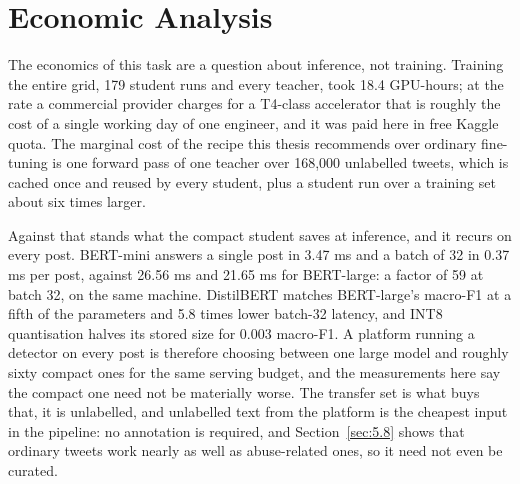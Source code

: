 \section{Economic Analysis}
\label{sec:econ}
The economics of this task are a question about inference, not training. Training the entire grid,
179 student runs and every teacher, took 18.4 GPU-hours; at the rate a commercial provider charges for
a T4-class accelerator that is roughly the cost of a single working day of one engineer, and it was
paid here in free Kaggle quota. The marginal cost of the recipe this thesis recommends over ordinary
fine-tuning is one forward pass of one teacher over 168,000 unlabelled tweets, which is cached once
and reused by every student, plus a student run over a training set about six times larger.

Against that stands what the compact student saves at inference, and it recurs on every post. BERT-mini
answers a single post in 3.47 ms and a batch of 32 in 0.37 ms per post, against 26.56 ms and 21.65 ms
for BERT-large: a factor of 59 at batch 32, on the same machine. DistilBERT matches BERT-large's
macro-F1 at a fifth of the parameters and 5.8 times lower batch-32 latency, and INT8 quantisation
halves its stored size for 0.003 macro-F1. A platform running a detector on every post is therefore
choosing between one large model and roughly sixty compact ones for the same serving budget, and the
measurements here say the compact one need not be materially worse. The transfer set is what buys
that, it is unlabelled, and unlabelled text from the platform is the cheapest input in the pipeline:
no annotation is required, and Section~\ref{sec:5.8} shows that ordinary tweets work nearly as well as
abuse-related ones, so it need not even be curated.
